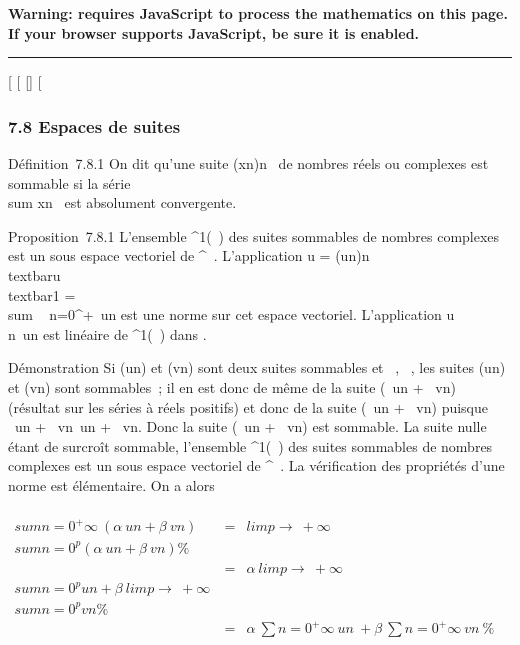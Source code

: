 \textbf{Warning: 
requires JavaScript to process the mathematics on this page.\\ If your
browser supports JavaScript, be sure it is enabled.}

\begin{center}\rule{3in}{0.4pt}\end{center}

{[}
{[}
{[}{]}
{[}

\subsubsection{7.8 Espaces de suites}

Définition~7.8.1 On dit qu'une suite (xn)n\in{}~ de
nombres réels ou complexes est sommable si la série
\\sum  xn~ est
absolument convergente.

Proposition~7.8.1 L'ensemble \ell^1(~) des suites sommables de
nombres complexes est un sous espace vectoriel de ^~.
L'application u =
(un)n\in{}~\mapsto~\\textbar{}u\\textbar{}1
= \\sum ~
n=0^+\infty~\textbar{}un\textbar{} est une norme sur
cet espace vectoriel. L'application
u\mapsto~\\\sum
 n\in{}~un est linéaire de \ell^1(~) dans .

Démonstration Si (un) et (vn) sont deux suites
sommables et \alpha~,\beta~ \in {}, les suites (\textbar{}un\textbar{}) et
(\textbar{}vn\textbar{}) sont sommables~; il en est donc de
même de la suite (\textbar{}\alpha~\textbar{}\textbar{}un\textbar{}
+ \textbar{}\beta~\textbar{}\textbar{}vn\textbar{}) (résultat sur
les séries à réels positifs) et donc de la suite
(\textbar{}\alpha~un + \beta~vn\textbar{}) puisque
\textbar{}\alpha~un +
\beta~vn\textbar{}\leq\textbar{}\alpha~\textbar{}\textbar{}un\textbar{}
+ \textbar{}\beta~\textbar{}\textbar{}vn\textbar{}. Donc la suite
(\alpha~un + \beta~vn) est sommable. La suite nulle étant de
surcroît sommable, l'ensemble \ell^1(~) des suites sommables de
nombres complexes est un sous espace vectoriel de ^~. La
vérification des propriétés d'une norme est élémentaire. On a alors

\begin{align*} \\sum
n=0^+\infty~(\alpha~u n + \beta~vn)& =&
limp\rightarrow~+\infty~~\\sum
n=0^p(\alpha~u n + \beta~vn) \%&
\\ & =&
\alpha~limp\rightarrow~+\infty~~\\sum
n=0^pu n +
\beta~limp\rightarrow~+\infty~\\sum
n=0^pv n\%& \\
& =& \alpha~\sum n=0^+\infty~u n~
+ \beta~\sum n=0^+\infty~v n~ \%&
\\ \end{align*}

